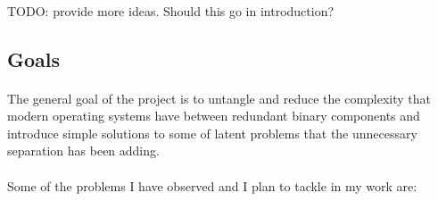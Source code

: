 \documentclass[12pt]{article}
\begin{document}
	\paragraph{}TODO: provide more ideas. Should this go in introduction?
	\subsection{Goals}
	\paragraph{}The general goal of the project is to untangle and reduce the complexity that modern operating systems have between redundant binary components and introduce simple solutions to some of latent problems that the unnecessary separation has been adding.	
	\paragraph{}Some of the problems I have observed and I plan to tackle in my work are:
\end{document}
